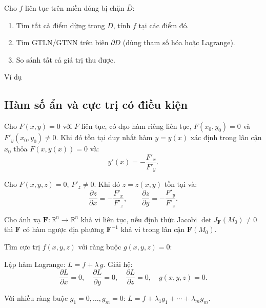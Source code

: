\documentclass[12pt,a4paper]{article}
\begin{document}
\begin{phuongphap}[title={GTLN, GTNN trên miền đóng bị chặn}]
  Cho $f$ liên tục trên miền đóng bị chặn $\overline{D}$:
  \begin{enumerate}
    \item Tìm tất cả điểm dừng trong $D$, tính $f$ tại các điểm đó.
    \item Tìm GTLN/GTNN trên biên $\partial D$ (dùng tham số hóa hoặc Lagrange).
    \item So sánh tất cả giá trị thu được.
  \end{enumerate}
\end{phuongphap}

Ví dụ

\subsection{Hàm số ẩn và cực trị có điều kiện}

\begin{dinhly}[title={Định lý hàm ẩn (hai biến)}]
  Cho $F(x, y) = 0$ với $F$ liên tục, có đạo hàm riêng liên tục, $F(x_0, y_0) = 0$ và $F'_y(x_0, y_0) \ne 0$. Khi đó tồn tại duy nhất hàm $y = y(x)$ xác định trong lân cận $x_0$ thỏa $F(x, y(x)) = 0$ và:
  \[
    y'(x) = -\dfrac{F'_x}{F'_y}.
  \]
\end{dinhly}

\begin{dinhly}[title={Hàm ẩn nhiều biến}]
  Cho $F(x, y, z) = 0$, $F'_z \ne 0$. Khi đó $z = z(x,y)$ tồn tại và:
  \[
    \dfrac{\partial z}{\partial x} = -\dfrac{F'_x}{F'_z}, \qquad \dfrac{\partial z}{\partial y} = -\dfrac{F'_y}{F'_z}.
  \]
\end{dinhly}

\begin{dinhly}[title={Định lý hàm ngược}]
  Cho ánh xạ $\mathbf{F}: \mathbb{R}^n \to \mathbb{R}^n$ khả vi liên tục, nếu định thức Jacobi $\det J_{\mathbf{F}}(M_0) \ne 0$ thì $\mathbf{F}$ có hàm ngược địa phương $\mathbf{F}^{-1}$ khả vi trong lân cận $\mathbf{F}(M_0)$.
\end{dinhly}

\begin{phuongphap}[title={Cực trị có điều kiện - Phương pháp nhân tử Lagrange}]
  Tìm cực trị $f(x, y, z)$ với ràng buộc $g(x,y,z) = 0$:

  Lập hàm Lagrange: $L = f + \lambda\, g$. Giải hệ:
  \[
    \dfrac{\partial L}{\partial x} = 0,\quad \dfrac{\partial L}{\partial y} = 0,\quad \dfrac{\partial L}{\partial z} = 0,\quad g(x,y,z) = 0.
  \]

  Với nhiều ràng buộc $g_1 = 0, \ldots, g_m = 0$: $L = f + \lambda_1 g_1 + \cdots + \lambda_m g_m$.
\end{phuongphap}
\end{document}
